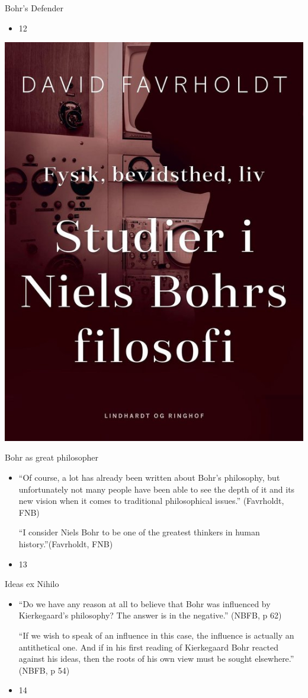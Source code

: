 \documentclass{beamer}
\begin{document}
\begin{frame}{Bohr’s Defender}
\begin{itemize}
  \item 12
\end{itemize}
\includegraphics[width=0.9\linewidth]{slide12_img4.jpg}
\end{frame}
\begin{frame}{Bohr as great philosopher}
\begin{itemize}
  \item “Of course, a lot has already been written about Bohr's philosophy, but unfortunately not many people have been able to see the depth of it and its new vision when it comes to traditional philosophical issues.” (Favrholdt, FNB)

“I consider Niels Bohr to be one of the greatest thinkers in human history.”(Favrholdt, FNB)
  \item 13
\end{itemize}
\end{frame}
\begin{frame}{Ideas ex Nihilo}
\begin{itemize}
  \item “Do we have any reason at all to believe that Bohr was influenced by Kierkegaard’s philosophy? The answer is in the negative.” (NBFB, p 62)

“If we wish to speak of an influence in this case, the influence is actually an antithetical one. And if in his first reading of Kierkegaard Bohr reacted against his ideas, then the roots of his own view must be sought elsewhere.” (NBFB, p 54)
  \item 14
\end{itemize}
\end{frame}
\end{document}
